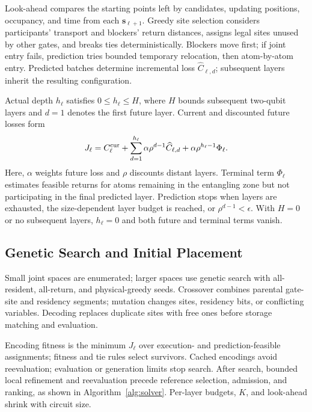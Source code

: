 Look-ahead compares the starting points left by candidates, updating positions, occupancy, and time from each $\mathbf{s}_{\ell+1}$. Greedy site selection considers participants' transport and blockers' return distances, assigns legal sites unused by other gates, and breaks ties deterministically. Blockers move first; if joint entry fails, prediction tries bounded temporary relocation, then atom-by-atom entry. Predicted batches determine incremental loss $\widehat C_{\ell,d}$; subsequent layers inherit the resulting configuration.

Actual depth $h_\ell$ satisfies $0\le h_\ell\le H$, where $H$ bounds subsequent two-qubit layers and $d=1$ denotes the first future layer. Current and discounted future losses form
\begin{equation}
J_\ell=C_\ell^{\rm cur}
+\sum_{d=1}^{h_\ell}\alpha\rho^{d-1}\widehat C_{\ell,d}
+\alpha\rho^{h_\ell-1}\Phi_\ell .
\label{eq:lookahead-cost}
\end{equation}
Here, $\alpha$ weights future loss and $\rho$ discounts distant layers. Terminal term $\Phi_\ell$ estimates feasible returns for atoms remaining in the entangling zone but not participating in the final predicted layer. Prediction stops when layers are exhausted, the size-dependent layer budget is reached, or $\rho^{d-1}<\epsilon$. With $H=0$ or no subsequent layers, $h_\ell=0$ and both future and terminal terms vanish.

\subsection{Genetic Search and Initial Placement}
\label{sec:initial-placement}

Small joint spaces are enumerated; larger spaces use genetic search\cite{holland1975adaptation} with all-resident, all-return, and physical-greedy seeds. Crossover combines parental gate-site and residency segments; mutation changes sites, residency bits, or conflicting variables. Decoding replaces duplicate sites with free ones before storage matching and evaluation.

Encoding fitness is the minimum $J_\ell$ over execution- and prediction-feasible assignments; fitness and tie rules select survivors. Cached encodings avoid reevaluation; evaluation or generation limits stop search. After search, bounded local refinement and reevaluation precede reference selection, admission, and ranking, as shown in Algorithm~\ref{alg:solver}. Per-layer budgets, $K$, and look-ahead shrink with circuit size.

